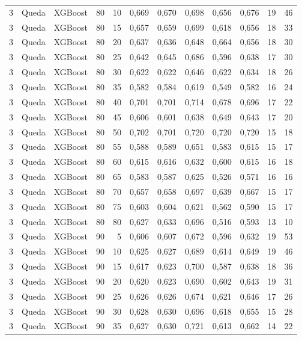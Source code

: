 \begin{longtable}{@{}rllrrrrrrrrr@{}}
3 & Queda & XGBoost & 80 & 10 & 0,669 & 0,670 & 0,698 & 0,656 & 0,676 & 19 & 46 \\
3 & Queda & XGBoost & 80 & 15 & 0,657 & 0,659 & 0,699 & 0,618 & 0,656 & 18 & 33 \\
3 & Queda & XGBoost & 80 & 20 & 0,637 & 0,636 & 0,648 & 0,664 & 0,656 & 18 & 30 \\
3 & Queda & XGBoost & 80 & 25 & 0,642 & 0,645 & 0,686 & 0,596 & 0,638 & 17 & 30 \\
3 & Queda & XGBoost & 80 & 30 & 0,622 & 0,622 & 0,646 & 0,622 & 0,634 & 18 & 26 \\
3 & Queda & XGBoost & 80 & 35 & 0,582 & 0,584 & 0,619 & 0,549 & 0,582 & 16 & 24 \\
3 & Queda & XGBoost & 80 & 40 & 0,701 & 0,701 & 0,714 & 0,678 & 0,696 & 17 & 22 \\
3 & Queda & XGBoost & 80 & 45 & 0,606 & 0,601 & 0,638 & 0,649 & 0,643 & 17 & 20 \\
3 & Queda & XGBoost & 80 & 50 & 0,702 & 0,701 & 0,720 & 0,720 & 0,720 & 15 & 18 \\
3 & Queda & XGBoost & 80 & 55 & 0,588 & 0,589 & 0,651 & 0,583 & 0,615 & 15 & 17 \\
3 & Queda & XGBoost & 80 & 60 & 0,615 & 0,616 & 0,632 & 0,600 & 0,615 & 16 & 18 \\
3 & Queda & XGBoost & 80 & 65 & 0,583 & 0,587 & 0,625 & 0,526 & 0,571 & 16 & 16 \\
3 & Queda & XGBoost & 80 & 70 & 0,657 & 0,658 & 0,697 & 0,639 & 0,667 & 15 & 17 \\
3 & Queda & XGBoost & 80 & 75 & 0,603 & 0,604 & 0,621 & 0,562 & 0,590 & 15 & 17 \\
3 & Queda & XGBoost & 80 & 80 & 0,627 & 0,633 & 0,696 & 0,516 & 0,593 & 13 & 10 \\
3 & Queda & XGBoost & 90 & 5 & 0,606 & 0,607 & 0,672 & 0,596 & 0,632 & 19 & 53 \\
3 & Queda & XGBoost & 90 & 10 & 0,625 & 0,627 & 0,689 & 0,614 & 0,649 & 19 & 46 \\
3 & Queda & XGBoost & 90 & 15 & 0,617 & 0,623 & 0,700 & 0,587 & 0,638 & 18 & 36 \\
3 & Queda & XGBoost & 90 & 20 & 0,620 & 0,623 & 0,690 & 0,602 & 0,643 & 19 & 31 \\
3 & Queda & XGBoost & 90 & 25 & 0,626 & 0,626 & 0,674 & 0,621 & 0,646 & 17 & 26 \\
3 & Queda & XGBoost & 90 & 30 & 0,628 & 0,630 & 0,696 & 0,618 & 0,655 & 15 & 28 \\
3 & Queda & XGBoost & 90 & 35 & 0,627 & 0,630 & 0,721 & 0,613 & 0,662 & 14 & 22 \\

\end{longtable}
